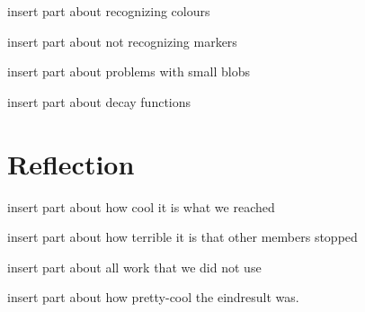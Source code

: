 \documentclass[a4paper,10pt]{article}
\begin{document}
insert part about recognizing colours

insert part about not recognizing markers

insert part about problems with small blobs

insert part about decay functions

\section{Reflection}

insert part about how cool it is what we reached

insert part about how terrible it is that other members stopped

insert part about all work that we did not use

insert part about how pretty-cool the eindresult was. 











\end{document}
